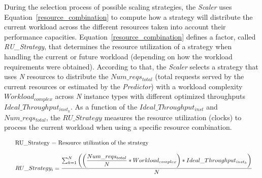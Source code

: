 During the selection process of possible scaling strategies, the \emph{Scaler} uses Equation~\ref{resource_combination} to compute how a strategy will distribute the current workload across the different resources taken into account their performance capacities.  Equation~\ref{resource_combination} defines a factor, called \emph{RU\_Strategy}, that determines the resource utilization of a strategy when handling the current or future workload (depending on how the workload requirements were obtained). According to that, the \emph{Scaler} selects a strategy that uses \emph{N} resources to distribute the \emph{$Num\_reqs_{total}$} (total requests served by the current resources or estimated by the \emph{Predictor}) with a workload complexity \emph{$Workload_{complex}$} across \emph{N} instance types with different optimized throughputs \emph{$Ideal\_Throughput_{inst_{k}}$}. As a function of the \emph{$Ideal\_Throughput_{inst}$} and \emph{$Num\_reqs_{total}$}, the \emph{$RU\_Strategy$} measures the resource utilization (clocks) to process the current workload when using a specific resource combination.




\vspace{-5mm}
{\scriptsize
\begin{equation}\label{resource_combination}
\resizebox{\linewidth}{!}{
\begin{tabular}{l@{}l@{}}
{\small RU\_Strategy = Resource utilization of the strategy } \\ \\
$RU\_Strategy_{i} = \dfrac{ \sum_{k=1}^N \bigg( \bigg( \dfrac{ Num\_reqs_{total} } {N}  * Workload_{complex} \bigg) * Ideal\_Throughput_{inst_{k}} \bigg) }  {N}$
\end{tabular}
}
\end{equation}
}




